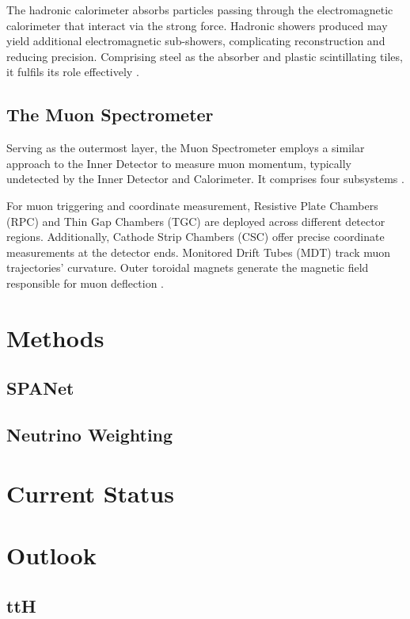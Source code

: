 \documentclass[bachelor,ngerman,english]{GAUBM}
\begin{document}
The hadronic calorimeter absorbs particles passing through the electromagnetic calorimeter that interact via the strong force. Hadronic showers produced may yield additional electromagnetic sub-showers, complicating reconstruction and reducing precision. Comprising steel as the absorber and plastic scintillating tiles, it fulfils its role effectively \cite{atlas_calorimeter}.

\section*{The Muon Spectrometer}
Serving as the outermost layer, the Muon Spectrometer employs a similar approach to the Inner Detector to measure muon momentum, typically undetected by the Inner Detector and Calorimeter. It comprises four subsystems \cite{atlas}.

For muon triggering and coordinate measurement, Resistive Plate Chambers (RPC) and Thin Gap Chambers (TGC) are deployed across different detector regions. Additionally, Cathode Strip Chambers (CSC) offer precise coordinate measurements at the detector ends. Monitored Drift Tubes (MDT) track muon trajectories' curvature. Outer toroidal magnets generate the magnetic field responsible for muon deflection \cite{atlas}.

\chapter{Methods}
\label{ch:methods}
\section{SPANet}
\section{Neutrino Weighting}

\chapter{Current Status}
\label{ch:current_status}

\chapter{Outlook}
\label{ch:outlook}

\section{ttH}
\end{document}
